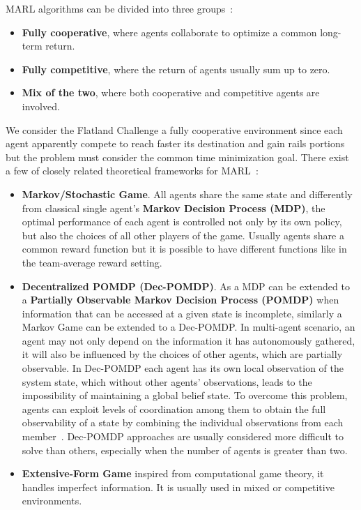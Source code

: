 \documentclass[11pt, a4paper, hidelinks]{report}
\begin{document}
MARL algorithms can be divided into three groups~\citep{zhang2019multiagent}:

\begin{itemize}
	\item \textbf{Fully cooperative}, where agents collaborate to optimize a common long-term return.
	\item \textbf{Fully competitive}, where the return of agents usually sum up to zero.
	\item \textbf{Mix of the two}, where both cooperative and competitive agents are involved.
\end{itemize}

We consider the Flatland Challenge a fully cooperative environment since each agent apparently compete to reach faster its destination and gain rails portions but the problem must consider the common time minimization goal.
There exist a few of closely related theoretical frameworks for MARL~\citep{zhang2019multiagent}:

\begin{itemize}
	\item \textbf{Markov/Stochastic Game}.
All agents share the same state and differently from classical single agent's \textbf{Markov Decision Process (MDP)}, the optimal performance of each agent is controlled not only by its own policy, but also the choices of all other players of the game.
Usually agents share a common reward function but it is possible to have different functions like in the team-average reward setting.
	\item \textbf{Decentralized POMDP (Dec-POMDP)}.
As a MDP can be extended to a \textbf{Partially Observable Markov Decision Process (POMDP)} when information that can be accessed at a given state is incomplete, similarly a Markov Game can be extended to a Dec-POMDP\@.
In multi-agent scenario, an agent may not only depend on the information it has autonomously gathered, it will also be influenced by the choices of other agents, which are partially observable.
In Dec-POMDP each agent has its own local observation of the system state, which without other agents' observations, leads to the impossibility of maintaining a global belief state.
To overcome this problem, agents can exploit levels of coordination among them to obtain the full observability of a state by combining the individual observations from each member~\citep{castaneda}.
Dec-POMDP approaches are usually considered more difficult to solve than others, especially when the number of agents is greater than two.
	\item \textbf{Extensive-Form Game} inspired from computational game theory, it handles imperfect information.
It is usually used in mixed or competitive environments.
\end{itemize}
\end{document}
